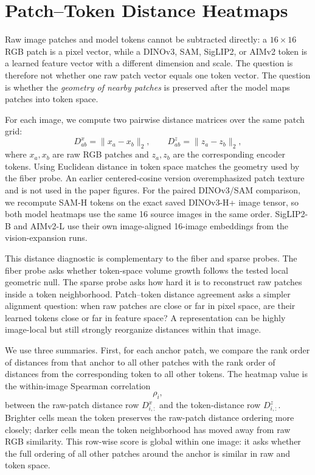 \section{Patch--Token Distance Heatmaps}
\label{app:patch-token-distance}

Raw image patches and model tokens cannot be subtracted directly: a $16\times16$ RGB patch is a pixel vector, while a DINOv3, SAM, SigLIP2, or AIMv2 token is a learned feature vector with a different dimension and scale. The question is therefore not whether one raw patch vector equals one token vector. The question is whether the \emph{geometry of nearby patches} is preserved after the model maps patches into token space.

For each image, we compute two pairwise distance matrices over the same patch grid:
\[
  D^x_{ab}=\|x_a-x_b\|_2,
  \qquad
  D^z_{ab}=\|z_a-z_b\|_2,
\]
where $x_a,x_b$ are raw RGB patches and $z_a,z_b$ are the corresponding encoder tokens. Using Euclidean distance in token space matches the geometry used by the fiber probe. An earlier centered-cosine version overemphasized patch texture and is not used in the paper figures. For the paired DINOv3/SAM comparison, we recompute SAM-H tokens on the exact saved DINOv3-H+ image tensor, so both model heatmaps use the same 16 source images in the same order. SigLIP2-B and AIMv2-L use their own image-aligned 16-image embeddings from the vision-expansion runs.

This distance diagnostic is complementary to the fiber and sparse probes. The fiber probe asks whether token-space volume growth follows the tested local geometric null. The sparse probe asks how hard it is to reconstruct raw patches inside a token neighborhood. Patch--token distance agreement asks a simpler alignment question: when raw patches are close or far in pixel space, are their learned tokens close or far in feature space? A representation can be highly image-local but still strongly reorganize distances within that image.

We use three summaries. First, for each anchor patch, we compare the rank order of distances from that anchor to all other patches with the rank order of distances from the corresponding token to all other tokens. The heatmap value is the within-image Spearman correlation
\[
  \rho_i,
\]
between the raw-patch distance row $D^x_{i,:}$ and the token-distance row $D^z_{i,:}$. Brighter cells mean the token preserves the raw-patch distance ordering more closely; darker cells mean the token neighborhood has moved away from raw RGB similarity. This row-wise score is global within one image: it asks whether the full ordering of all other patches around the anchor is similar in raw and token space.

